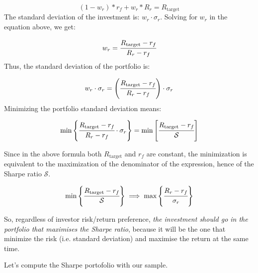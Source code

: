 \begin{equation*} 
(1 - w_r) * r_f + w_r * R_r =R_\textrm{target} 
\end{equation*}
\noindent
The standard deviation of the investment is: \(w_r\cdot \sigma_r\). Solving for \(w_r\) in the equation above, we get:

\begin{equation*} 
	w_r = \cfrac{R_\textrm{target} - r_f}{R_r - r_f} 
\end{equation*}
Thus, the standard deviation of the portfolio is:

\begin{equation*} 
w_r\cdot \sigma_r = \left(\cfrac{R_\textrm{target} - r_f}{R_r - r_f}\right)\cdot \sigma_r 
\end{equation*}
Minimizing the portfolio standard deviation means:

\begin{equation} 
\textrm{min}\left\{\cfrac{R_\textrm{target} - r_f}{R_r - r_f}\cdot \sigma_r\right\} = \textrm{min}\left[\cfrac{R_\textrm{target} - r_f}{\mathcal{S}}\right]
\end{equation}

Since in the above formula both $R_{\textrm{target}}$ and $r_f$ are constant, the minimization is equivalent to the maximization of the denominator of the expression, hence of the Sharpe ratio $\mathcal{S}$.

\begin{equation} 
\textrm{min}\left\{\cfrac{R_\textrm{target} - r_f}{\mathcal{S}}\right\}
\implies\textrm{max}\left\{\cfrac{R_r - r_f}{\sigma_r}\right\}
\end{equation}

So, regardless of investor risk/return preference, \emph{the investment should go in the portfolio that maximises the Sharpe ratio}, because it will be the one that minimize the risk (i.e. standard deviation) and maximise the return at the same time.

Let's compute the Sharpe portofolio with our sample.

